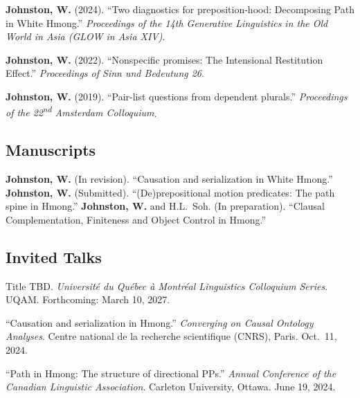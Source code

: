 \documentclass[11pt,oneside,letterpaper]{johnstoncv}
\begin{document}
\begin{entries}
 \textbf{Johnston, W.} (2024). ``Two diagnostics for preposition-hood: Decomposing Path in White Hmong.'' \emph{Proceedings of the 14th Generative Linguistics in the Old World in Asia (GLOW in Asia XIV)}.

\Pub \textbf{Johnston, W.} (2022). ``Nonspecific promises: The Intensional Restitution Effect.'' \textit{Proceedings of Sinn und Bedeutung 26}.

\Pub \textbf{Johnston, W.} (2019). ``Pair-list questions from dependent plurals.'' \textit{Proceedings of the 22\textsuperscript{nd} Amsterdam Colloquium}.



\subsection{Manuscripts}

\Pub \textbf{Johnston, W.} (In revision). ``Causation and serialization in White Hmong.''
\Pub \textbf{Johnston, W.} (Submitted). ``(De)prepositional motion predicates: The path spine in Hmong.''
\Pub \textbf{Johnston, W.} and H.L.\ Soh. (In preparation). ``Clausal Complementation, Finiteness and Object Control in Hmong.''

\subsection{Invited Talks}

\Pub Title TBD. \textit{Université du Québec à Montréal Linguistics Colloquium Series}. UQAM. Forthcoming: March 10, 2027.

\Pub ``Causation and serialization in Hmong.'' \textit{Converging on Causal Ontology Analyses}. Centre national de la recherche scientifique (CNRS), Paris. Oct.\ 11, 2024.

\Pub ``Path in Hmong: The structure of directional PPs.'' \textit{Annual Conference of the Canadian Linguistic Association}. Carleton University, Ottawa. June 19, 2024.


\end{entries}
\end{document}
